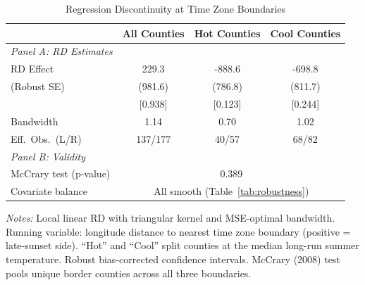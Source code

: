 \begin{table}[htbp]
\centering
\caption{Regression Discontinuity at Time Zone Boundaries}
\label{tab:rdd}
\small
\begin{tabular}{lccc}
\hline\hline
 & All Counties & Hot Counties & Cool Counties \\
\hline
\textit{Panel A: RD Estimates} & & & \\
RD Effect & 229.3 & -888.6 & -698.8 \\
\quad (Robust SE) & (981.6) & (786.8) & (811.7) \\
\quad [p-value] & [0.938] & [0.123] & [0.244] \\
Bandwidth & 1.14 & 0.70 & 1.02 \\
Eff.\ Obs.\ (L/R) & 137/177 & 40/57 & 68/82 \\
\hline
\textit{Panel B: Validity} & & & \\
McCrary test (p-value) & \multicolumn{3}{c}{0.389} \\
Covariate balance & \multicolumn{3}{c}{All smooth (Table~\ref{tab:robustness})} \\
\hline\hline
\end{tabular}
\begin{tablenotes}[flushleft]\small
\item \textit{Notes:} Local linear RD with triangular kernel and MSE-optimal bandwidth. Running variable: longitude distance to nearest time zone boundary (positive = late-sunset side). ``Hot'' and ``Cool'' split counties at the median long-run summer temperature. Robust bias-corrected confidence intervals. McCrary (2008) test pools unique border counties across all three boundaries.
\end{tablenotes}
\end{table}


